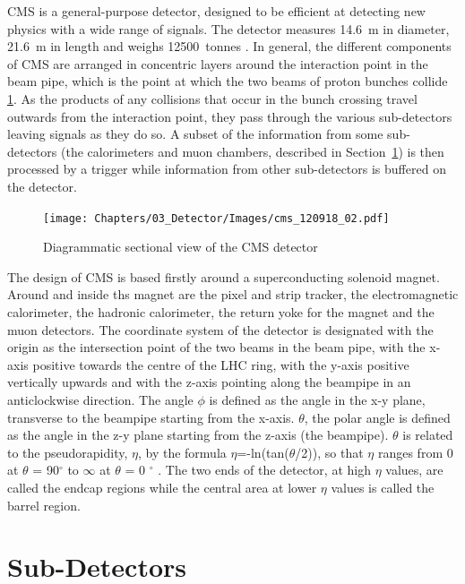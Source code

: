 CMS is a general-purpose detector, designed to be efficient at detecting new physics with a wide range of
signals. The detector measures 14.6~m in diameter, 21.6~m in length and weighs 12500~tonnes
\cite{CMS_experiment}. In general, the different components of CMS are arranged in concentric layers around
the interaction point in the beam pipe, which is the point at which the two beams of proton bunches collide
\ref{fig:CMS_diagram}. As the products of any collisions that occur in the bunch crossing travel outwards from
the interaction point, they pass through the various sub-detectors leaving signals as they do so. A subset of
the information from some sub-detectors (the calorimeters and muon chambers, described in
Section~\ref{s:Subdetectors}) is then processed by a trigger while information from other sub-detectors is
buffered on the detector.

\begin{figure}[hbtp]
   \centering
     \texttt{[image: Chapters/03\_Detector/Images/cms\_120918\_02.pdf]}\hfill
     \caption{Diagrammatic sectional view of the CMS detector \cite{Sakuma_sketchup}}
     \label{fig:CMS_diagram}
 \end{figure}

The design of CMS is based firstly around a superconducting solenoid magnet. Around and inside ths magnet are
the pixel and strip tracker, the electromagnetic calorimeter, the hadronic calorimeter, the return yoke for
the magnet and the muon detectors. The coordinate system of the detector is designated with the origin as the
intersection point of the two beams in the beam pipe, with the x-axis positive towards the centre of the LHC
ring, with the y-axis positive vertically upwards and with the z-axis pointing along the beampipe in an
anticlockwise direction. The angle $\phi$ is defined as the angle in the x-y plane, transverse to the beampipe
starting from the x-axis. $\theta$, the polar angle is defined as the angle in the z-y plane starting from the
z-axis (the beampipe). $\theta$ is related to the pseudorapidity, $\eta$, by the formula
$\eta$=-ln(tan($\theta$/2)), so that $\eta$ ranges from 0 at $\theta$ = 90$^{\circ}$ to $\infty$ at $\theta$ =
0 $^{\circ}$ \cite{CMS_TDR1}. The two ends of the detector, at high $\eta$ values, are called the endcap regions while the
central area at lower $\eta$ values is called the barrel region.

\section{Sub-Detectors}
\label{s:Subdetectors}

